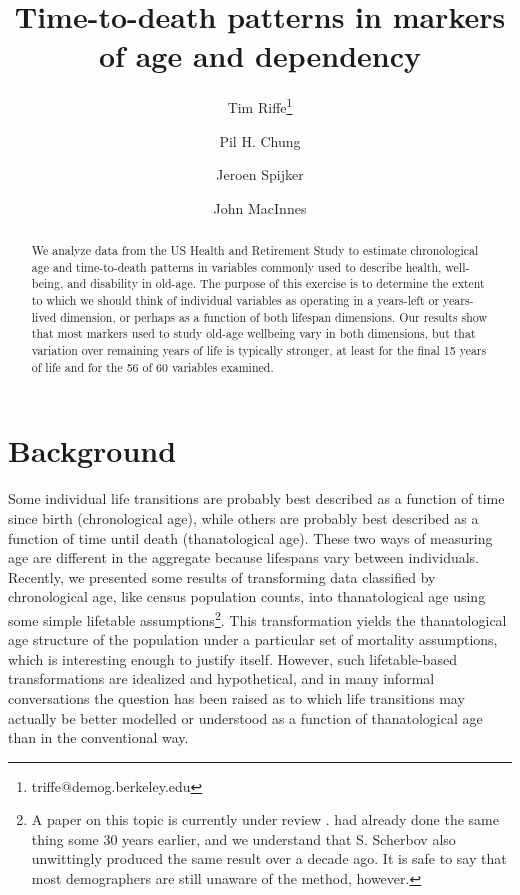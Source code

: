 \documentclass{article}
\begin{document}
\title{Time-to-death patterns in markers of age and dependency}

\author[1]{Tim Riffe\thanks{triffe@demog.berkeley.edu}}
\author[1]{Pil H. Chung}
\author[2,3]{Jeroen Spijker}
\author[4]{John MacInnes}

\maketitle

\begin{abstract}
We analyze data from the US Health and Retirement Study to estimate
chronological age and time-to-death patterns in variables commonly
used to describe health, well-being, and disability in old-age. The purpose of this exercise is to
determine the extent to which we should think of individual variables as
operating in a years-left or years-lived dimension, or perhaps as a function of
both lifespan dimensions. Our results show that most markers used to study
old-age wellbeing vary in both dimensions, but that variation over remaining
years of life is typically stronger, at least for the final 15 years of life
and for the 56 of 60 variables examined.
\end{abstract}


\section{Background}
Some individual life transitions are probably best described as a function of
time since birth (chronological age), while others are probably best described as a
function of time until death (thanatological age). These two ways of
measuring age are different in the aggregate because lifespans vary between
individuals.
Recently, we presented some results of transforming
data classified by chronological age, like census population counts, into
thanatological age using some simple lifetable
assumptions\footnote{A paper on this topic is
currently under review \citep{riffe2014paaposter}. \citet{brouard1986structure,
brouard1989mouvements} had already done the same thing some 30 years earlier, and we understand that
S. Scherbov also unwittingly produced the same result over a decade ago. It is
safe to say that most demographers are still unaware of the method, however.}.
This transformation yields the thanatological age structure of the population
under a particular set of mortality assumptions, which is interesting enough to
justify itself.
However, such lifetable-based transformations are idealized and hypothetical, and in many informal
conversations the question has been raised as to which life transitions
may actually be better modelled or understood as a function of thanatological
age than in the conventional way.
\end{document}
